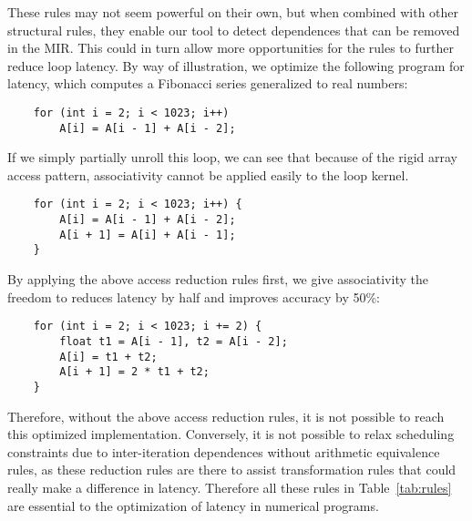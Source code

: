 These rules may not seem powerful on their own, but when combined with other
structural rules, they enable our tool to detect dependences that can be
removed in the MIR\@.  This could in turn allow more opportunities for the
rules to further reduce loop latency.  By way of illustration, we optimize the
following program for latency, which computes a Fibonacci series generalized to
real numbers:
\begin{lstlisting}
    for (int i = 2; i < 1023; i++)
        A[i] = A[i - 1] + A[i - 2];
\end{lstlisting}
If we simply partially unroll this loop, we can see that because of the
rigid array access pattern, associativity cannot be applied easily to the
loop kernel.
\begin{lstlisting}
    for (int i = 2; i < 1023; i++) {
        A[i] = A[i - 1] + A[i - 2];
        A[i + 1] = A[i] + A[i - 1];
    }
\end{lstlisting}
By applying the above access reduction rules first, we give associativity the
freedom to reduces latency by half and improves accuracy by 50\%:
\begin{lstlisting}
    for (int i = 2; i < 1023; i += 2) {
        float t1 = A[i - 1], t2 = A[i - 2];
        A[i] = t1 + t2;
        A[i + 1] = 2 * t1 + t2;
    }
\end{lstlisting}
Therefore, without the above access reduction rules, it is not possible to
reach this optimized implementation.  Conversely, it is not possible to relax
scheduling constraints due to inter-iteration dependences without arithmetic
equivalence rules, as these reduction rules are there to assist transformation
rules that could really make a difference in latency.  Therefore all these
rules in Table~\ref{tab:rules} are essential to the optimization of latency in
numerical programs.
